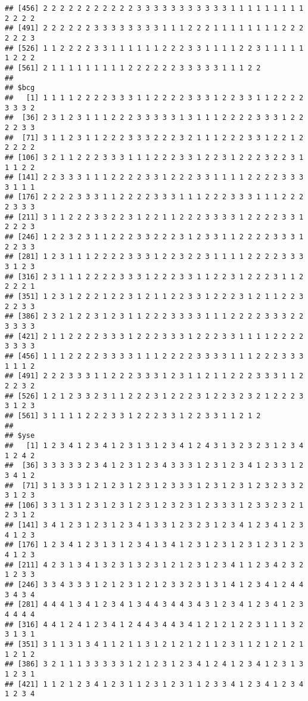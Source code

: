 \documentclass[]{article}
\begin{document}
\begin{verbatim}
## [456] 2 2 2 2 2 2 2 2 2 2 2 3 3 3 3 3 3 3 3 3 3 3 1 1 1 1 1 1 1 1 1 2 2 2 2
## [491] 2 2 2 2 2 2 3 3 3 3 3 3 3 3 1 1 1 2 2 2 1 1 1 1 1 1 1 1 2 2 2 2 2 2 3
## [526] 1 1 2 2 2 2 3 3 1 1 1 1 1 1 2 2 2 3 3 1 1 1 1 2 2 3 1 1 1 1 1 1 2 2 2
## [561] 2 1 1 1 1 1 1 1 1 1 2 2 2 2 2 2 3 3 3 3 3 1 1 1 2 2
## 
## $bcg
##   [1] 1 1 1 1 2 2 2 2 3 3 3 1 1 2 2 2 2 3 3 3 1 2 2 3 3 1 1 2 2 2 2 3 3 3 2
##  [36] 2 3 1 2 3 1 1 1 2 2 2 3 3 3 3 3 1 3 1 1 1 2 2 2 2 3 3 3 1 2 2 2 2 3 3
##  [71] 3 1 1 2 3 1 1 2 2 2 3 3 3 2 2 2 3 2 1 1 1 2 2 2 3 3 1 2 2 1 2 2 2 2 2
## [106] 3 2 1 1 2 2 2 3 3 3 1 1 1 2 2 2 3 3 1 2 2 3 1 2 2 2 3 2 2 3 1 1 1 2 2
## [141] 2 2 3 3 3 1 1 1 2 2 2 2 3 3 1 2 2 2 3 3 1 1 1 1 2 2 2 2 3 3 3 3 1 1 1
## [176] 2 2 2 2 3 3 3 1 1 2 2 2 2 3 3 3 1 1 1 2 2 2 3 3 3 1 1 1 2 2 2 2 3 3 3
## [211] 3 1 1 2 2 2 3 3 2 2 3 1 2 2 1 1 2 2 2 3 3 3 3 1 2 2 2 2 3 3 1 2 2 2 3
## [246] 1 2 2 3 2 3 1 1 2 2 2 3 3 2 2 2 3 1 2 3 3 1 1 2 2 2 2 3 3 3 1 2 2 3 3
## [281] 1 2 3 1 1 1 2 2 2 2 3 3 3 1 2 2 3 2 2 3 1 1 1 1 2 2 2 2 3 3 3 3 1 2 3
## [316] 2 3 1 1 1 2 2 2 2 3 3 3 1 2 2 2 3 3 1 1 2 2 3 1 2 2 2 3 1 1 2 2 2 2 1
## [351] 1 2 3 1 2 2 2 1 2 2 3 1 2 1 1 2 2 3 3 1 2 2 2 3 1 2 1 1 2 2 3 2 2 3 3
## [386] 2 3 2 1 2 2 3 1 2 3 1 1 2 2 2 3 3 3 3 1 1 1 2 2 2 2 3 3 3 2 2 3 3 3 3
## [421] 2 1 1 2 2 2 2 3 3 3 1 2 2 2 3 3 3 1 2 2 2 3 3 1 1 1 1 2 2 2 2 3 3 3 3
## [456] 1 1 1 2 2 2 2 3 3 3 3 1 1 1 2 2 2 2 3 3 3 3 1 1 1 2 2 2 3 3 3 1 1 1 2
## [491] 2 2 2 3 3 3 1 1 2 2 2 3 3 3 1 2 3 1 1 2 1 1 2 2 2 3 3 3 1 1 2 2 2 3 2
## [526] 1 2 1 2 3 3 2 3 1 1 2 2 2 3 1 2 2 2 3 1 2 2 3 2 3 2 1 2 2 2 3 3 1 2 3
## [561] 3 1 1 1 1 2 2 2 3 3 1 2 2 2 3 3 1 2 2 3 3 1 1 2 1 2
## 
## $yse
##   [1] 1 2 3 4 1 2 3 4 1 2 3 1 3 1 2 3 4 1 2 4 3 1 3 2 3 2 3 1 2 3 4 1 2 4 2
##  [36] 3 3 3 3 3 2 3 4 1 2 3 1 2 3 4 3 3 3 1 2 3 1 2 3 4 1 2 3 3 1 2 3 4 1 2
##  [71] 3 1 3 3 3 1 2 1 2 3 1 2 3 1 2 3 3 3 1 2 3 1 2 3 1 2 3 2 3 3 2 3 1 2 3
## [106] 3 3 1 3 1 2 3 1 2 3 1 2 3 1 2 3 2 3 1 2 3 3 3 1 2 3 3 2 3 2 1 2 3 1 2
## [141] 3 4 1 2 3 1 2 3 1 2 3 4 1 3 3 1 2 3 2 3 1 2 3 4 1 2 3 4 1 2 3 4 1 2 3
## [176] 1 2 3 4 1 2 3 1 3 1 2 3 4 1 3 4 1 2 3 1 2 3 1 2 3 1 2 3 1 2 3 4 1 2 3
## [211] 4 2 3 1 3 4 1 3 2 3 1 3 2 3 1 2 1 2 3 1 2 3 4 1 1 2 3 4 2 3 2 1 2 3 3
## [246] 3 3 4 3 3 3 1 2 1 2 3 1 2 1 2 3 3 2 3 1 3 1 4 1 2 3 4 1 2 4 4 3 4 3 4
## [281] 4 4 4 1 3 4 1 2 3 4 1 3 4 4 3 4 4 3 4 3 1 2 3 4 1 2 3 4 1 2 3 4 4 4 4
## [316] 4 4 1 2 4 1 2 3 4 1 2 4 4 3 4 4 3 4 1 2 1 2 1 2 2 3 1 1 1 3 2 3 1 3 1
## [351] 3 1 1 3 1 3 4 1 1 2 1 1 3 1 2 1 2 1 2 1 1 2 3 1 1 2 1 2 1 2 1 1 2 1 2
## [386] 3 2 1 1 1 3 3 3 3 3 1 2 1 2 3 1 2 3 4 1 2 4 1 2 3 4 1 2 3 1 3 1 2 3 1
## [421] 1 1 2 1 2 3 4 1 2 3 1 1 2 3 1 2 3 1 1 2 3 3 4 1 2 3 4 1 2 3 4 1 2 3 4

\end{verbatim}
\end{document}
